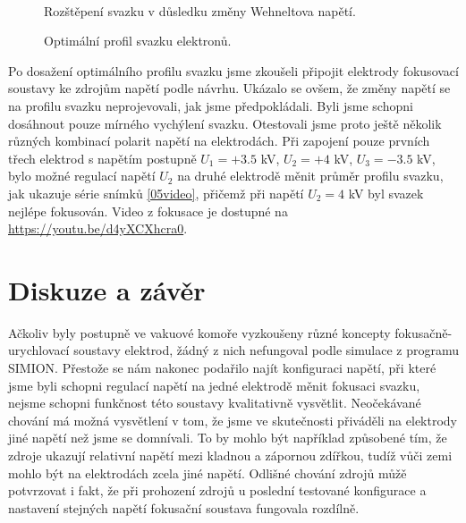 \begin{figure}[h!]
\begin{minipage}[c]{200pt}
\end{minipage}
\\
\begin{minipage}[c]{200pt}
\caption[Dva svazky]{Rozštěpení svazku v důsledku změny Wehneltova napětí.}
\label{05dvaSvazky}
\end{minipage}
\begin{minipage}[c]{5pt}
\end{minipage}
\vspace{0.1cm}
\begin{minipage}[c]{200pt}
\caption[Optimum]{Optimální profil svazku elektronů.}
\label{05optimum}
\end{minipage}
\end{figure}

Po dosažení optimálního profilu svazku jsme zkoušeli připojit elektrody fokusovací soustavy ke zdrojům napětí podle návrhu. Ukázalo se ovšem, že změny napětí se na profilu svazku neprojevovali, jak jsme předpokládali. Byli jsme schopni dosáhnout pouze mírného vychýlení svazku. Otestovali jsme proto ještě několik různých kombinací polarit napětí na elektrodách. Při zapojení pouze prvních třech elektrod s napětím postupně $U_1 = +3.5$ kV, $U_2 = +4$ kV, $U_3 = -3.5$ kV, bylo možné regulací napětí $U_2$ na druhé elektrodě měnit průměr profilu svazku, jak ukazuje série snímků \ref{05video}, přičemž při napětí $U_2 = 4$ kV byl svazek nejlépe fokusován. Video z fokusace je dostupné na \url{https://youtu.be/d4yXCXhcra0}.

\section{Diskuze a závěr}

Ačkoliv byly postupně ve vakuové komoře vyzkoušeny různé koncepty fokusačně-urychlovací soustavy elektrod, žádný z nich nefungoval podle simulace z programu SIMION. Přestože se nám nakonec podařilo najít konfiguraci napětí, při které jsme byli schopni regulací napětí na jedné elektrodě měnit fokusaci svazku, nejsme schopni funkčnost této soustavy kvalitativně vysvětlit. Neočekávané chování má možná vysvětlení v tom, že jsme ve skutečnosti přiváděli na elektrody jiné napětí než jsme se domnívali. To by mohlo být například způsobené tím, že zdroje ukazují relativní napětí mezi kladnou a zápornou zdířkou, tudíž vůči zemi mohlo být na elektrodách zcela jiné napětí. Odlišné chování zdrojů můžě potvrzovat i fakt, že při prohození zdrojů u poslední testované konfigurace a nastavení stejných napětí fokusační soustava fungovala rozdílně.\\

